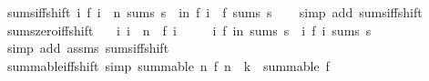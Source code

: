 \begin{isabellebody}
%
\endisadelimproof
\isanewline
{}\isamarkupfalse%
\ sums{\isacharunderscore}{\kern0pt}iff{\isacharunderscore}{\kern0pt}shift{\isacharprime}{\kern0pt}{\isacharcolon}{\kern0pt}\ {\isachardoublequoteopen}{\isacharparenleft}{\kern0pt}{\isasymlambda}i{\isachardot}{\kern0pt}\ f\ {\isacharparenleft}{\kern0pt}i\ {\isacharplus}{\kern0pt}\ n{\isacharparenright}{\kern0pt}{\isacharparenright}{\kern0pt}\ sums\ {\isacharparenleft}{\kern0pt}s\ {\isacharminus}{\kern0pt}\ {\isacharparenleft}{\kern0pt}{\isasymSum}i{\isacharless}{\kern0pt}n{\isachardot}{\kern0pt}\ f\ i{\isacharparenright}{\kern0pt}{\isacharparenright}{\kern0pt}\ {\isasymlongleftrightarrow}\ f\ sums\ s{\isachardoublequoteclose}\isanewline
%
\isadelimproof
\ \ %
\endisadelimproof
%
\isatagproof
{}\isamarkupfalse%
\ {\isacharparenleft}{\kern0pt}simp\ add{\isacharcolon}{\kern0pt}\ sums{\isacharunderscore}{\kern0pt}iff{\isacharunderscore}{\kern0pt}shift{\isacharparenright}{\kern0pt}%
\endisatagproof
{\isafoldproof}%
%
\isadelimproof
\isanewline
%
\endisadelimproof
\isanewline
{}\isamarkupfalse%
\ sums{\isacharunderscore}{\kern0pt}zero{\isacharunderscore}{\kern0pt}iff{\isacharunderscore}{\kern0pt}shift{\isacharcolon}{\kern0pt}\isanewline
\ \ \ {\isachardoublequoteopen}{\isasymAnd}i{\isachardot}{\kern0pt}\ i\ {\isacharless}{\kern0pt}\ n\ {\isasymLongrightarrow}\ f\ i\ {\isacharequal}{\kern0pt}\ {}{\isachardoublequoteclose}\isanewline
\ \ \ {\isachardoublequoteopen}{\isacharparenleft}{\kern0pt}{\isasymlambda}i{\isachardot}{\kern0pt}\ f\ {\isacharparenleft}{\kern0pt}i{\isacharplus}{\kern0pt}n{\isacharparenright}{\kern0pt}{\isacharparenright}{\kern0pt}\ sums\ s\ {\isasymlongleftrightarrow}\ {\isacharparenleft}{\kern0pt}{\isasymlambda}i{\isachardot}{\kern0pt}\ f\ i{\isacharparenright}{\kern0pt}\ sums\ s{\isachardoublequoteclose}\isanewline
%
\isadelimproof
\ \ %
\endisadelimproof
%
\isatagproof
{}\isamarkupfalse%
\ {\isacharparenleft}{\kern0pt}simp\ add{\isacharcolon}{\kern0pt}\ assms\ sums{\isacharunderscore}{\kern0pt}iff{\isacharunderscore}{\kern0pt}shift{\isacharparenright}{\kern0pt}%
\endisatagproof
{\isafoldproof}%
%
\isadelimproof
\isanewline
%
\endisadelimproof
\isanewline
{}\isamarkupfalse%
\ summable{\isacharunderscore}{\kern0pt}iff{\isacharunderscore}{\kern0pt}shift\ {\isacharbrackleft}{\kern0pt}simp{\isacharbrackright}{\kern0pt}{\isacharcolon}{\kern0pt}\ {\isachardoublequoteopen}summable\ {\isacharparenleft}{\kern0pt}{\isasymlambda}n{\isachardot}{\kern0pt}\ f\ {\isacharparenleft}{\kern0pt}n\ {\isacharplus}{\kern0pt}\ k{\isacharparenright}{\kern0pt}{\isacharparenright}{\kern0pt}\ {\isasymlongleftrightarrow}\ summable\ f{\isachardoublequoteclose}\isanewline

\end{isabellebody}
